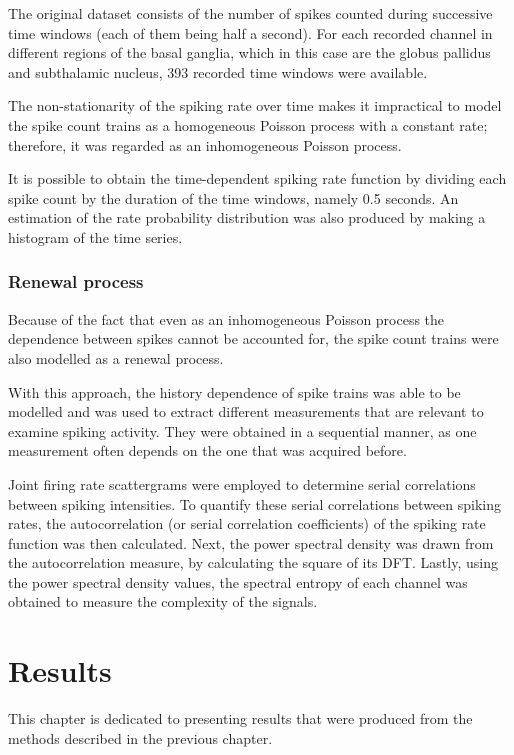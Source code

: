 \documentclass{kththesis}
\begin{document}
The original dataset consists of the number of spikes counted during successive time windows (each of them being half a second). 
For each recorded channel in different regions of the basal ganglia, which in this case are the globus pallidus and subthalamic nucleus, 393 recorded time windows were available.

The non-stationarity of the spiking rate over time makes it impractical to model the spike count trains as a homogeneous Poisson process with a constant rate; therefore, it was regarded as an inhomogeneous Poisson process.

It is possible to obtain the time-dependent spiking rate function by dividing each spike count by the duration of the time windows, namely 0.5 seconds. 
An estimation of the rate probability distribution was also produced by making a histogram of the time series.

\subsection{Renewal process}\label{RP Method}

Because of the fact that even as an inhomogeneous Poisson process the dependence between spikes cannot be accounted for, the spike count trains were also modelled as a renewal process.

With this approach, the history dependence of spike trains was able to be modelled and was used to extract different measurements that are relevant to examine spiking activity. 
They were obtained in a sequential manner, as one measurement often depends on the one that was acquired before.

Joint firing rate scattergrams were employed to determine serial correlations between spiking intensities. 
To quantify these serial correlations between spiking rates, the autocorrelation (or serial correlation coefficients) of the spiking rate function was then calculated. 
Next, the power spectral density was drawn from the autocorrelation measure, by calculating the square of its DFT. 
Lastly, using the power spectral density values, the spectral entropy of each channel was obtained to measure the complexity of the signals.

\newpage
\chapter{Results}

This chapter is dedicated to presenting results that were produced from the methods described in the previous chapter.
\end{document}
